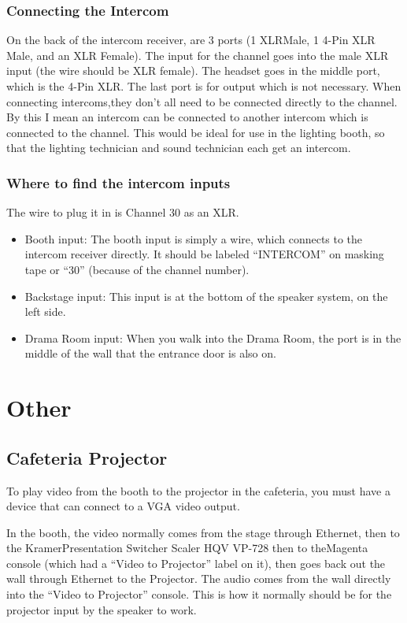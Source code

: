 \documentclass{article}
\begin{document}
\subsubsection{Connecting the Intercom}
On the back of the intercom receiver, are 3 ports (1 XLRMale, 1 4-Pin XLR Male, and an XLR Female). The input for the channel goes into the male XLR input (the wire should be XLR female). The headset goes in the middle port, which is the 4-Pin XLR. The last port is for output which is not necessary. When connecting intercoms,they don’t all need to be connected directly to the channel. By this I mean an intercom can be connected to another intercom which is connected to the channel. This would be ideal for use in the lighting booth, so that the lighting technician and sound technician each get an intercom.

\subsubsection{Where to find the intercom inputs}
The wire to plug it in is Channel 30 as an XLR.
\begin{itemize}
    \item Booth input: The booth input is simply a wire, which connects to the intercom receiver directly. It should be labeled ``INTERCOM'' on masking tape or ``30'' (because of the channel number).
    \item Backstage input: This input is at the bottom of the speaker system, on the left side.
    \item Drama Room input: When you walk into the Drama Room, the port is in the middle of the wall that the entrance door is also on.
\end{itemize}

\section{Other}
\subsection{Cafeteria Projector} \label{sec:caf_projector}
To play video from the booth to the projector in the cafeteria, you must have a device that can connect to a VGA video output.

In the booth, the video normally comes from the stage through Ethernet, then to the KramerPresentation Switcher Scaler HQV VP-728 then to theMagenta console (which had a ``Video to Projector'' label on it), then goes back out the wall through Ethernet to the Projector. The audio comes from the wall directly into the ``Video to Projector'' console. This is how it normally should be for the projector input by the speaker to work.
\end{document}
